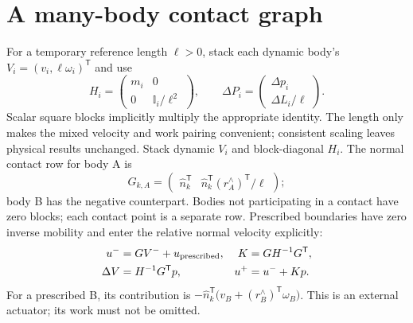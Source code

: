 \documentclass[11pt]{article}
\begin{document}
\section{A many-body contact graph}
For a temporary reference length $\ell>0$, stack each dynamic body's
$V_i=(v_i,\ell\omega_i)^{\mathsf T}$ and use
\begin{equation}
 H_i=\begin{pmatrix}m_i&0\\0&\mathbb I_i/\ell^2\end{pmatrix},\qquad
 \Delta P_i=\begin{pmatrix}\Delta p_i\\\Delta L_i/\ell\end{pmatrix}.
\end{equation}
Scalar square blocks implicitly multiply the appropriate identity. The length
only makes the mixed velocity and work pairing convenient; consistent scaling
leaves physical results unchanged. Stack dynamic $V_i$ and block-diagonal $H_i$.
The normal contact row for body A is
\begin{equation}
 G_{k,A}=\begin{pmatrix}\hat n_k^{\mathsf T}&
 \hat n_k^{\mathsf T}(r_A^{\wedge})^{\mathsf T}/\ell\end{pmatrix};
\end{equation}
body B has the negative counterpart. Bodies not participating in a contact have
zero blocks; each contact point is a separate row. Prescribed boundaries have
zero inverse mobility and enter the relative normal velocity explicitly:
\begin{align}
 u^-&=GV^-+u_{\rm prescribed},&K&=GH^{-1}G^{\mathsf T},\\
 \Delta V&=H^{-1}G^{\mathsf T}p,&u^+&=u^-+Kp.
\end{align}
For a prescribed B, its contribution is
$-\hat n_k^{\mathsf T}\bigl(v_B+(r_B^{\wedge})^{\mathsf T}\omega_B\bigr)$.
This is an external actuator; its work must not be omitted.
\end{document}
